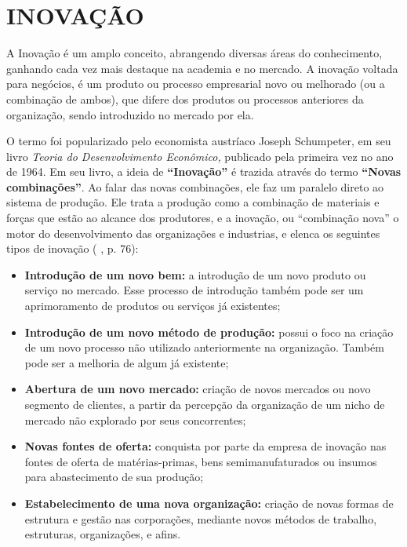 \section{INOVAÇÃO}
\label{inovacao}

A Inovação é um amplo conceito, abrangendo diversas áreas do conhecimento, ganhando cada vez mais destaque na academia e no mercado. A inovação voltada para negócios, é um produto ou processo empresarial novo ou melhorado (ou a combinação de ambos), que difere dos produtos ou processos anteriores da organização, sendo introduzido no mercado por ela. \cite{ocde2018}

O termo foi popularizado pelo economista austríaco Joseph Schumpeter, em seu livro \textit{Teoria do Desenvolvimento Econômico,} publicado pela primeira vez no ano de 1964. Em seu livro, a ideia de \textbf{“Inovação”} é trazida através do termo \textbf{“Novas combinações”}. Ao falar das novas combinações, ele faz um paralelo direto ao sistema de produção. Ele trata a produção como a combinação de materiais e forças que estão ao alcance dos produtores, e a inovação, ou “combinação nova” o motor do desenvolvimento das organizações e industrias, e elenca os seguintes tipos de inovação (\citeauthor{schumpeter1997} \citeyear{schumpeter1997}, p. 76):

\begin{itemize}
    \item \textbf{Introdução de um novo bem:} a introdução de um novo produto ou serviço no mercado. Esse processo de introdução também pode ser um aprimoramento de produtos ou serviços já existentes;
    \item \textbf{Introdução de um novo método de produção:} possui o foco na criação de um novo processo não utilizado anteriormente na organização. Também pode ser a melhoria de algum já existente;
    \item \textbf{Abertura de um novo mercado:} criação de novos mercados ou novo segmento de clientes, a partir da percepção da organização de um nicho de mercado não explorado por seus concorrentes;
    \item \textbf{Novas fontes de oferta:} conquista por parte da empresa de inovação nas fontes de oferta de matérias-primas, bens semimanufaturados ou insumos para abastecimento de sua produção;
    \item \textbf{Estabelecimento de uma nova organização:} criação de novas formas de estrutura e gestão nas corporações, mediante novos métodos de trabalho, estruturas, organizações, e afins.
\end{itemize}

